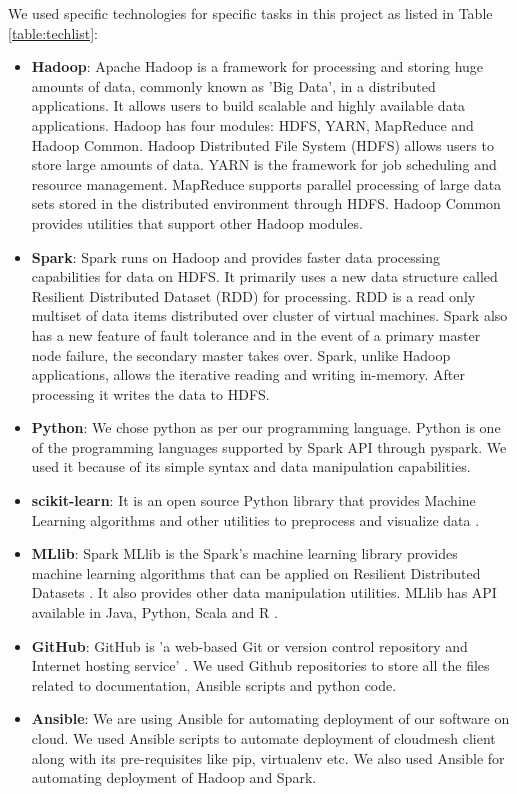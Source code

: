 \documentclass[9pt,twocolumn,twoside]{styles/osajnl}
\begin{document}
We used specific technologies for specific tasks in this project as listed in Table \ref{table:techlist}:
\begin{itemize}
 \item \textbf{Hadoop}: Apache Hadoop is a framework for processing and storing huge amounts of data, commonly known as 'Big Data', in a distributed applications. It allows users to build scalable and highly available data applications. Hadoop has four modules: HDFS, YARN, MapReduce and Hadoop Common. Hadoop Distributed File System (HDFS) allows users to store large amounts of data.  YARN is the framework for job scheduling and resource management. MapReduce supports parallel processing of large data sets stored in the distributed environment through HDFS. Hadoop Common provides utilities that support other Hadoop modules.
 
 \item \textbf{Spark}: Spark runs on Hadoop and provides faster data processing capabilities for data on HDFS. It primarily uses a new data structure called Resilient Distributed Dataset (RDD) for processing. RDD is a read only multiset of data items distributed over cluster of virtual machines. Spark also has a new feature of fault tolerance and in the event of a primary master node failure, the secondary master takes over. Spark, unlike Hadoop applications, allows the iterative reading and writing in-memory. After processing it writes the data to HDFS.
 
 \item \textbf{Python}: We chose python as per our programming language. Python is one of the programming languages supported by Spark API through pyspark. We used it because of its simple syntax and data manipulation capabilities.
 \item \textbf{scikit-learn}: It is an open source Python library that provides Machine Learning algorithms and other utilities to preprocess and visualize data \cite{www-sklearn}.
 
 \item \textbf{MLlib}: Spark MLlib is the Spark’s machine learning library provides machine learning algorithms that can be applied on Resilient Distributed Datasets \cite{www-mllibguide}. It also provides other data manipulation utilities. MLlib has API available in Java, Python, Scala and R \cite{www-mllib}.
 
 
 
 \item \textbf{GitHub}: GitHub is 'a web-based Git or version control repository and Internet hosting service' \cite{www-wikigit}. We used Github repositories to store all the files related to documentation, Ansible scripts and python code.
 \item \textbf{Ansible}: We are using Ansible for automating deployment of our software on cloud. We used Ansible scripts to automate deployment of cloudmesh client along with its pre-requisites like pip, virtualenv etc. We also used Ansible for automating deployment of Hadoop and Spark.
\end{itemize}
\end{document}
